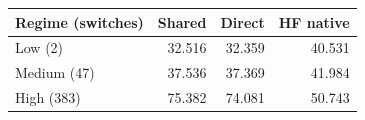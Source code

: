 \begin{tabular}{lrrr}
\toprule
Regime (switches) & Shared & Direct & HF native\\
\midrule
Low (2) & 32.516 & 32.359 & 40.531\\
Medium (47) & 37.536 & 37.369 & 41.984\\
High (383) & 75.382 & 74.081 & 50.743\\
\bottomrule
\end{tabular}
